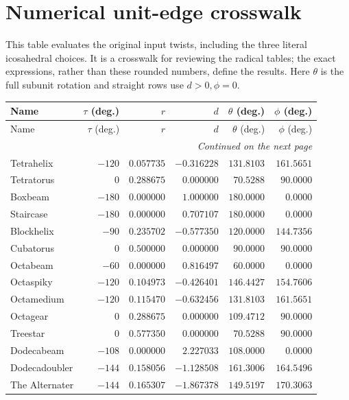 \documentclass[11pt]{article}
\theoremstyle{definition}
\begin{document}
\section{Numerical unit-edge crosswalk}\label{app:numeric}
This table evaluates the original input twists, including the three literal
icosahedral choices. It is a crosswalk for reviewing the radical tables;
the exact expressions, rather than these rounded numbers, define the results.
Here $\theta$ is the full subunit rotation and straight rows use $d>0,\phi=0$.
\small
\renewcommand{\arraystretch}{1.1}
\begin{longtable}{@{}lrrrrr@{}}
\toprule
Name & $\tau$ (deg.) & $r$ & $d$ & $\theta$ (deg.) & $\phi$ (deg.)\\
\midrule
\endfirsthead
\toprule
Name & $\tau$ (deg.) & $r$ & $d$ & $\theta$ (deg.) & $\phi$ (deg.)\\
\midrule
\endhead
\midrule
\multicolumn{6}{r}{\emph{Continued on the next page}}\\
\endfoot
\bottomrule
\endlastfoot
Tetrahelix & $-120$ & $0.057735$ & $-0.316228$ & $131.8103$ & $161.5651$\\
Tetratorus & $0$ & $0.288675$ & $0.000000$ & $70.5288$ & $90.0000$\\
\addlinespace[0.4em]
Boxbeam & $-180$ & $0.000000$ & $1.000000$ & $180.0000$ & $0.0000$\\
Staircase & $-180$ & $0.000000$ & $0.707107$ & $180.0000$ & $0.0000$\\
Blockhelix & $-90$ & $0.235702$ & $-0.577350$ & $120.0000$ & $144.7356$\\
Cubatorus & $0$ & $0.500000$ & $0.000000$ & $90.0000$ & $90.0000$\\
\addlinespace[0.4em]
Octabeam & $-60$ & $0.000000$ & $0.816497$ & $60.0000$ & $0.0000$\\
Octaspiky & $-120$ & $0.104973$ & $-0.426401$ & $146.4427$ & $154.7606$\\
Octamedium & $-120$ & $0.115470$ & $-0.632456$ & $131.8103$ & $161.5651$\\
Octagear & $0$ & $0.288675$ & $0.000000$ & $109.4712$ & $90.0000$\\
Treestar & $0$ & $0.577350$ & $0.000000$ & $70.5288$ & $90.0000$\\
\addlinespace[0.4em]
Dodecabeam & $-108$ & $0.000000$ & $2.227033$ & $108.0000$ & $0.0000$\\
Dodecadoubler & $-144$ & $0.158056$ & $-1.128508$ & $161.3006$ & $164.5496$\\
The Alternater & $-144$ & $0.165307$ & $-1.867378$ & $149.5197$ & $170.3063$\\

\end{longtable}
\end{document}
